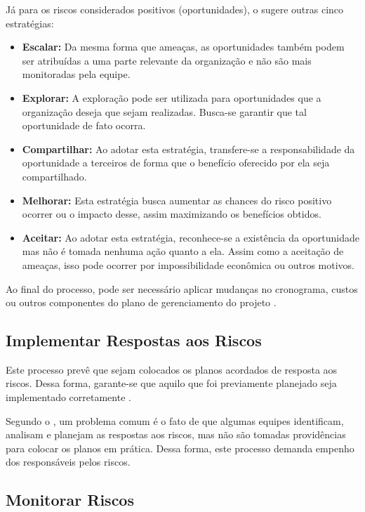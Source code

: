 \documentclass[
    12pt,       %
    openright,      %
    twoside,      %
    a4paper,      %
    english,      %
    french,       %
    spanish,      %
    brazil,       %
    ]{abntex2}
\begin{document}
Já para os riscos considerados positivos (oportunidades), o  sugere outras cinco estratégias:

\begin{itemize}
    \item \textbf{Escalar: } Da mesma forma que ameaças, as oportunidades também podem ser atribuídas a uma parte relevante da organização e não são mais monitoradas pela equipe.
    \item \textbf{Explorar: } A exploração pode ser utilizada para oportunidades que a organização deseja que sejam realizadas. Busca-se garantir que tal oportunidade de fato ocorra.
    \item \textbf{Compartilhar: } Ao adotar esta estratégia, transfere-se a responsabilidade da oportunidade a terceiros de forma que o benefício oferecido por ela seja compartilhado.   
    \item \textbf{Melhorar: } Esta estratégia busca aumentar as chances do risco positivo ocorrer ou o impacto desse, assim maximizando os benefícios obtidos. 
    \item \textbf{Aceitar: } Ao adotar esta estratégia, reconhece-se a existência da oportunidade mas não é tomada nenhuma ação quanto a ela. Assim como a aceitação de ameaças, isso pode ocorrer por impossibilidade econômica ou outros motivos.
\end{itemize}

Ao final do processo, pode ser necessário aplicar mudanças no cronograma, custos ou outros componentes do plano de gerenciamento do projeto \cite{PMBOK:2017}.

\subsection{Implementar Respostas aos Riscos}

Este processo prevê que sejam colocados os planos acordados de resposta aos riscos. Dessa forma, garante-se que aquilo que foi previamente planejado seja implementado corretamente \cite{PMBOK:2017}.

Segundo o , um problema comum é o fato de que algumas equipes identificam, analisam e planejam as respostas aos riscos, mas não são tomadas providências para colocar os planos em prática. Dessa forma, este processo demanda empenho dos responsáveis pelos riscos.

\subsection{Monitorar Riscos}
\end{document}
